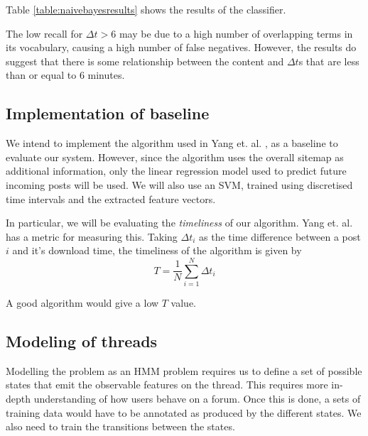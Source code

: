 \documentclass[12 pt]{article}
\begin{document}
Table \ref{table:naivebayesresults} shows the results of the classifier.


\begin{table}
	\label{table:naivebayesresults}
	\caption{Naive Bayes classification results}
\end{table}
The low recall for $\Delta t > 6$ may be due to a high number of overlapping terms in its vocabulary, causing a high number of false negatives. However, the results do suggest that there is some relationship between the content and $\Delta t$s that are less than or equal to 6 minutes. 


\subsection{Implementation of baseline}
We intend to implement the algorithm used in Yang et. al. \cite{Yang2009}, as a baseline to evaluate our system. However, since the algorithm uses the overall sitemap as additional information, only the linear regression model used to predict future incoming posts will be used. We will also use an SVM, trained using discretised time intervals and the extracted feature vectors.

In particular, we will be evaluating the \emph{timeliness} of our algorithm. Yang et. al. \cite{Yang2009} has a metric for measuring this. Taking $\Delta t_i$ as the time difference between a post $i$ and it's download time, the timeliness of the algorithm is given by
\[T = \frac{1}{N} \sum^{N}_{i=1}\Delta t_i\]

A good algorithm would give a low $T$ value.
\subsection{Modeling of threads}
Modelling the problem as an HMM problem requires us to define a set of possible states that emit the observable features on the thread. This requires more in-depth understanding of how users behave on a forum. Once this is done, a sets of training data would have to be annotated as produced by the different states. We also need to train the transitions between the states.
\end{document}
